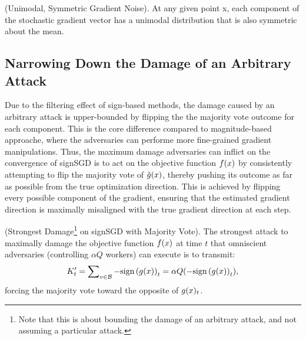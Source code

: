 \begin{assumption} \textnormal{(Unimodal, Symmetric Gradient Noise).}
    At any given point x, each component of the stochastic gradient vector \gradest{} has a unimodal distribution that is also symmetric about the mean.
\end{assumption}


\subsection{Narrowing Down the Damage of an Arbitrary Attack}


Due to the filtering effect of sign-based methods, the damage caused by an arbitrary attack is upper-bounded by flipping the the majority vote outcome for each component.
This is the core difference compared to magnitude-based approache, where the adversaries can performe more fine-grained gradient manipulations. 
Thus, the maximum damage adversaries can inflict on the convergence of signSGD is to act on the objective function $f(x)$ by consistently attempting to flip the majority vote of $\tilde{g}(x)$, thereby pushing its outcome as far as possible from the true optimization direction. This is achieved by flipping every possible component of the gradient, ensuring that the estimated gradient direction is maximally misaligned with the true gradient direction at each step.


\begin{theorem} \textnormal{(Strongest Damage\footnote{Note that this is about bounding the damage of an arbitrary attack, and not assuming a particular attack.} on signSGD with Majority Vote).} \label{theorem_strongest_attack}
The strongest attack to maximally damage the objective function $f(x)$ at time $t$ that omniscient adversaries (controlling $\alpha Q$ workers) can execute is to transmit:
\begin{equation*} 
K'_t = \sum\nolimits_{v \in \mathcal B} -\textnormal{sign}\left(g(x)\right)_t = \alpha Q (-\textnormal{sign}\left(g(x)\right)_t),
\end{equation*}
forcing the majority vote toward the opposite of $g(x)_t$.
\end{theorem}

